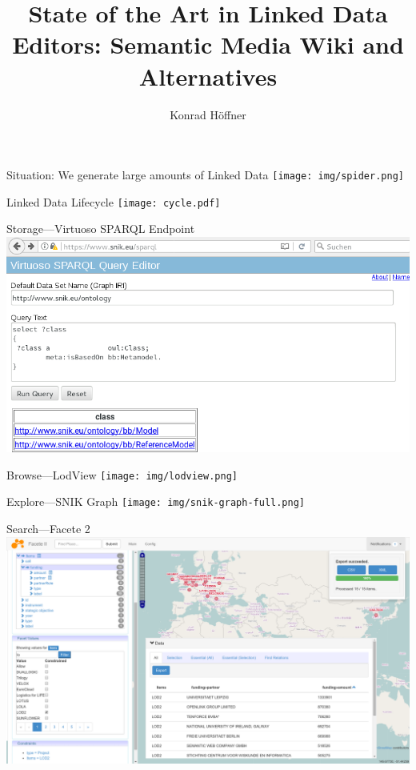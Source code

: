 \documentclass[aspectratio=1610]{beamer}
\title{State of the Art in Linked Data Editors: Semantic Media Wiki and Alternatives}
\author{Konrad Höffner}
\begin{document}
\begin{frame}
\titlepage
\end{frame}

\begin{frame}{Situation: We generate large amounts of Linked Data}
\centering
\texttt{[image: img/spider.png]}
\end{frame}

\begin{frame}{Linked Data Lifecycle}
\centering
\texttt{[image: cycle.pdf]}
\end{frame}

\begin{frame}{Storage---Virtuoso SPARQL Endpoint}
\centering
\includegraphics[width=\textwidth]{img/sparqlresult.png}
\end{frame}

\begin{frame}{Browse---LodView}
\centering
\texttt{[image: img/lodview.png]}
\end{frame}

\begin{frame}{Explore---SNIK Graph}
\centering
\texttt{[image: img/snik-graph-full.png]}
\end{frame}

\begin{frame}{Search---Facete 2}
\centering
\includegraphics[width=\textwidth]{img/facete2.png}
\end{frame}
\end{document}
